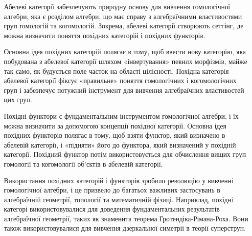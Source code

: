 Абелеві категорії забезпечують природну основу для вивчення
гомологічної алгебри, яка є розділом алгебри, що має справу
з алгебраїчними властивостями груп гомологій та когомологій.
Зокрема, абелеві категорії створюють сеттінг, де можна визначити
поняття похідних категорій і похідних функторів.

Основна ідея похідних категорій полягає в тому, щоб ввести нову
категорію, яка побудована з абелевої категорії шляхом «інвертування»
певних морфізмів, майже так само, як будується поле часток на області
цілісності. Похідна категорія абелевої категорії фіксує «правильне»
поняття гомологічних і когомологічних груп і забезпечує потужний
інструмент для вивчення алгебраїчних властивостей цих груп.

Похідні функтори є фундаментальним інструментом гомологічної
алгебри, і їх можна визначити за допомогою концепції похідної
категорії. Основна ідея похідних функторів полягає в тому, щоб
взяти функтор, який визначено в абелевій категорії, і «підняти»
його до функтора, який визначений у похідній категорії. Похідний
функтор потім використовується для обчислення вищих груп гомології
та когомології об'єктів в абелевій категорії.

Використання похідних категорій і функторів зробило революцію у
вивченні гомологічної алгебри, і це призвело до багатьох важливих
застосувань в алгебраїчній геометрії, топології та математичній
фізиці. Наприклад, похідні категорі використовувалися для доведення
фундаментальних результатів алгебраїчної геометрії, таких як
знаменита теорема Гротендіка-Рімана-Роха. Вони також використовувалися
для вивчення дзеркальної симетрії в теорії суперструн.
